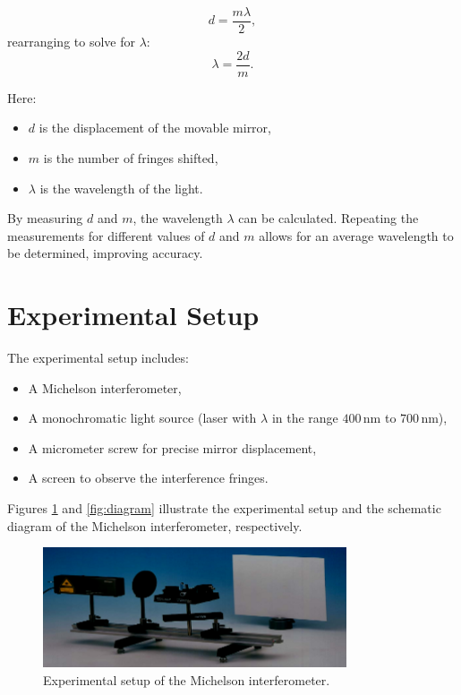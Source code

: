 \documentclass[journal]{IEEEtran}
\begin{document}
\begin{equation}
d = \frac{m\lambda}{2},
\end{equation}
rearranging to solve for \( \lambda \):
\begin{equation}
\lambda = \frac{2d}{m}.
\label{eq:lambda}
\end{equation}


Here:
\begin{itemize}
    \item \( d \) is the displacement of the movable mirror,
    \item \( m \) is the number of fringes shifted,
    \item \( \lambda \) is the wavelength of the light.
\end{itemize}
By measuring \( d \) and \( m \), the wavelength \( \lambda \) can be calculated. Repeating the measurements for different values of \( d \) and \( m \) allows for an average wavelength to be determined, improving accuracy.

\section{Experimental Setup}
The experimental setup includes:
\begin{itemize}
    \item A Michelson interferometer,
    \item A monochromatic light source (laser with \( \lambda \) in the range \( 400 \, \text{nm} \) to \( 700 \, \text{nm} \)),
    \item A micrometer screw for precise mirror displacement,
    \item A screen to observe the interference fringes.
\end{itemize}

Figures \ref{fig:setup} and \ref{fig:diagram} illustrate the experimental setup and the schematic diagram of the Michelson interferometer, respectively.

\begin{figure}[H]
    \centering
    \includegraphics[width=0.8\linewidth]{../IMAGES/setup.png}
    \caption{Experimental setup of the Michelson interferometer.}
    \label{fig:setup}
\end{figure}
\end{document}

